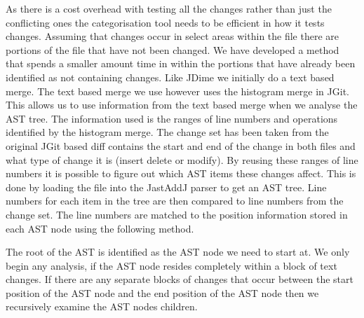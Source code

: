 As there is a cost overhead with testing all the changes rather than just the conflicting ones the categorisation tool needs to be efficient in how it tests changes.  Assuming that changes occur in select areas within the file there are portions of the file that have not been changed.  We have developed a method that spends a smaller amount time in  within the portions that have already been identified as not containing changes.  Like JDime we initially do a text based merge.  The text based merge we use however uses the histogram merge in JGit.  This allows us to use information from the text based merge when we analyse the AST tree.  The information used is the ranges of line numbers and operations identified by the histogram merge. The change set has been taken from the original JGit based diff contains the start and end of the change in both files and what type of change it is (insert delete or modify).  By reusing these ranges of line numbers it is possible to figure out which AST items these changes affect. This is done by loading the file into the JastAddJ parser to get an AST tree. Line numbers for each item in the tree are then compared to line numbers from the change set. The line numbers are matched to the position information stored in each AST node using the following method.

The root of the AST is identified as the AST node we need to start at. 
We only begin any analysis, if the AST node resides completely within a block of text changes.
If there are any separate blocks of changes that occur between the start position of the AST node and the end position of the AST node then we recursively examine the AST nodes children.

% 
% 



